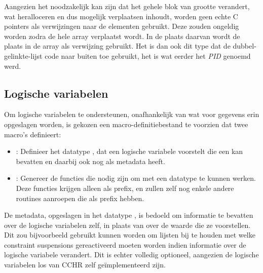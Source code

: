 Aangezien het noodzakelijk kan zijn dat het gehele blok van grootte verandert, wat heralloceren en dus mogelijk verplaatsen inhoudt, worden geen echte C pointers als verwijzingen naar de elementen gebruikt. Deze zouden ongeldig worden zodra de hele array verplaatst wordt. In de plaats daarvan wordt de plaats in de array als verwijzing gebruikt. Het is dan ook dit type dat de dubbel-gelinkte-lijst code naar buiten toe gebruikt, het is wat eerder het {\em PID} genoemd werd. 

\subsection{Logische variabelen} \label{sec:logvar}

Om logische variabelen te ondersteunen, onafhankelijk van wat voor gegevens erin opgeslagen worden, is gekozen een macro-definitiebestand te voorzien dat twee macro's definieert: \begin{itemize}
  \item {}: Definieer het datatype , dat een logische variabele voorstelt die een  kan bevatten en daarbij ook nog  als metadata heeft.
  \item {}: Genereer de functies die nodig zijn om met een  datatype te kunnen werken. Deze functies krijgen alleen  als prefix, en zullen zelf nog enkele andere routines aanroepen die  als prefix hebben.
\end{itemize}

De metadata, opgeslagen in het datatype , is bedoeld om informatie te bevatten over de logische variabelen zelf, in plaats van over de waarde die ze voorstellen. Dit zou bijvoorbeeld gebruikt kunnen worden om lijsten bij te houden met welke constraint suspensions gereactiveerd moeten worden indien informatie over de logische variabele verandert. Dit is echter volledig optioneel, aangezien de logische variabelen los van CCHR zelf ge\"implementeerd zijn.

